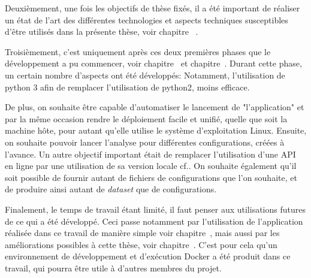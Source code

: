 Deuxièmement, une fois les objectifs de thèse fixés, il a été important de réaliser un état de l'art des différentes technologies et aspects techniques susceptibles d'être utilisés dans la présente thèse, voir chapitre~ .

Troisièmement, c'est uniquement après ces deux premières phases que le développement a pu commencer, voir chapitre~ et chapitre~.
Durant cette phase, un certain nombre d'aspects ont été développés:
Notamment, l'utilisation de python 3 afin de remplacer l'utilisation de python2, moins efficace.

De plus, on souhaite être capable d'automatiser le lancement de "l'application" et par la même occasion rendre le déploiement facile et unifié, quelle que soit la machine hôte, pour autant qu'elle utilise le système d'exploitation Linux. Ensuite, on souhaite pouvoir lancer l'analyse pour différentes configurations, créées à l'avance. Un autre objectif important était de remplacer l'utilisation d'une API en ligne par une utilisation de sa version locale cf.. On souhaite également qu'il soit possible de fournir autant de fichiers de configurations que l'on souhaite, et de produire ainsi autant de \emph{dataset} que de configurations.

Finalement, le temps de travail étant limité, il faut penser aux utilisations futures de ce qui a été développé. Ceci passe notamment par l'utilisation de l'application réalisée dans ce travail de manière simple voir chapitre~, mais aussi par les améliorations possibles à cette thèse, voir chapitre~. C'est pour cela qu'un environnement de développement et d'exécution Docker a été produit dans ce travail, qui pourra être utile à d'autres membres du projet. 

